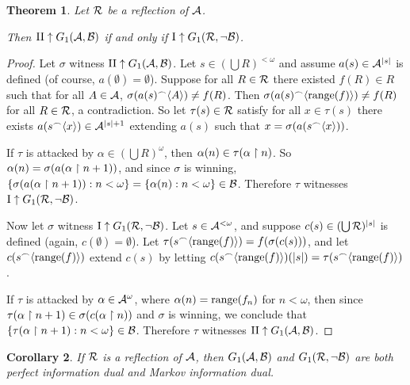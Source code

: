 \documentclass{amsart}
\theoremstyle{plain}
\newtheorem{theorem}{Theorem}
\newtheorem{corollary}[theorem]{Corollary}
\theoremstyle{definition}
\theoremstyle{remark}
\theoremstyle{plain}
\theoremstyle{definition}
\theoremstyle{remark}
\begin{document}
\begin{theorem}
  Let \(\mathcal{R}\) be a reflection of \(\mathcal{A}\). 

  Then
  \(\mathrm{II}\uparrow G_{1}(\mathcal{A},\mathcal{B})\) if and only if
  \(\mathrm{I}\uparrow G_{1}(\mathcal{R},\neg\mathcal{B})\).
\end{theorem}

\begin{proof}
  Let \(\sigma\) witness 
  \(\mathrm{II}\uparrow G_{1}(\mathcal{A},\mathcal{B})\).
  Let \(s\in(\bigcup R)^{<\omega}\) and assume \(a(s)\in\mathcal{A}^{|s|}\) is defined
  (of course, \(a(\emptyset)=\emptyset\)).
  Suppose for all \(R\in\mathcal{R}\) there existed \(f(R)\in R\) such that for all
  \(A\in\mathcal{A}\), \(\sigma(a(s){^\frown}\langle A\rangle)\not=f(R)\). Then 
  \(\sigma(a(s){^\frown}\langle\text{range}(f)\rangle)\not=f(R)\) for all \(R\in\mathcal{R}\), a contradiction.
  So let \(\tau(s)\in\mathcal{R}\) satisfy for all \(x\in\tau(s)\) there exists
  \(a(s{^\frown}\langle x\rangle)\in\mathcal{A}^{|s|+1}\) extending \(a(s)\) such that 
  \(x=\sigma(a(s{^\frown}\langle x\rangle))\).

  If \(\tau\) is attacked by \(\alpha\in(\bigcup R)^\omega\), then 
  \(\alpha(n)\in\tau(\alpha\restriction n)\). So \(\alpha(n)=\sigma(a(\alpha\restriction n+1))\),
  and since \(\sigma\) is winning, 
  \(\{\sigma(a(\alpha\restriction n+1)):n<\omega\}=\{\alpha(n):n<\omega\}\in\mathcal{B}\).
  Therefore \(\tau\) witnesses
  \(\mathrm{I}\uparrow G_{1}(\mathcal{R},\neg\mathcal{B})\).

  Now let \(\sigma\) witness
  \(\mathrm{I}\uparrow G_{1}(\mathcal{R},\neg\mathcal{B})\).
  Let \(s\in\mathcal{A}^{<\omega}\), and suppose \(c(s)\in(\bigcup \mathcal{R})^{|s|}\) is defined
  (again, \(c(\emptyset)=\emptyset\)). Let \(\tau(s{^\frown}\langle\text{range}(f)\rangle)=f(\sigma(c(s)))\),
  and let \(c(s{^\frown}\langle\text{range}(f)\rangle)\) extend \(c(s)\) by letting
  \(c(s{^\frown}\langle\text{range}(f)\rangle)(|s|)=\tau(s{^\frown}\langle\text{range}(f)\rangle)\).

  If \(\tau\) is attacked by \(\alpha\in\mathcal{A}^\omega\), where \(\alpha(n)=\text{range}(f_n)\)
  for \(n<\omega\), then since \(\tau(\alpha\restriction n+1)\in\sigma(c(\alpha\restriction n))\)
  and \(\sigma\) is winning, we conclude that 
  \(\{\tau(\alpha\restriction n+1):n<\omega\}\in\mathcal{B}\).
  Therefore \(\tau\) witnesses
  \(\mathrm{II}\uparrow G_{1}(\mathcal{A},\mathcal{B})\).
\end{proof}

\begin{corollary}
  If \(\mathcal{R}\) is a reflection of \(\mathcal{A}\),
  then \(G_{1}(\mathcal{A},\mathcal{B})\) and \(G_{1}(\mathcal{R},\neg\mathcal{B})\)
  are both perfect information dual and Markov information dual.
\end{corollary}



\end{document}
